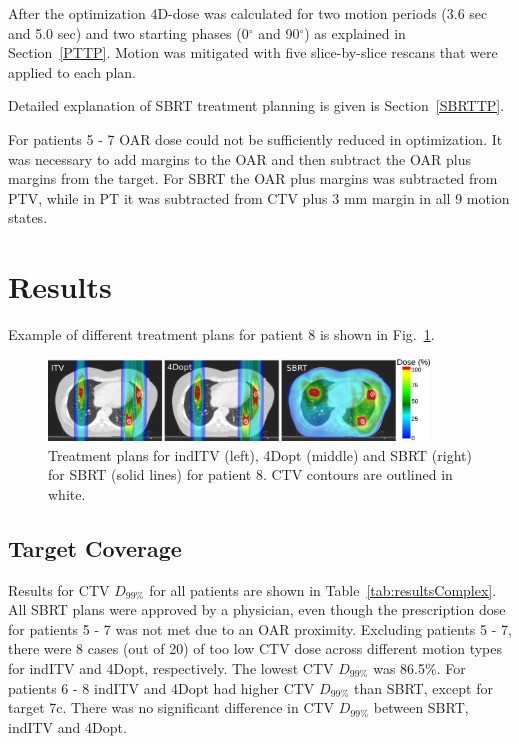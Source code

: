 After the optimization 4D-dose was calculated for two motion periods (3.6 sec and 5.0 sec) and two starting phases (0$^\circ$ and 90$^\circ$) as explained in Section~\ref{PTTP}. Motion was mitigated with five 
slice-by-slice rescans that were applied to each plan.

Detailed explanation of SBRT treatment planning is given is Section~\ref{SBRTTP}.

For patients 5 - 7 OAR dose could not be sufficiently reduced in optimization. It was necessary to add margins to the OAR and then 
subtract the OAR plus margins from the target. For SBRT the OAR plus margins was subtracted from PTV, while in PT it was subtracted from CTV plus 3 mm margin in all 9 motion states.

\section{Results}

Example of different treatment plans for patient 8 is shown in Fig.~\ref{Fig:multiExample}.

\begin{figure}[H]
	\begin{center}
		\includegraphics[width=0.9\textwidth]{./ComplexPatients/Images/multiExample.png}
		\caption{Treatment plans for indITV (left), 4Dopt (middle) and SBRT (right) for SBRT (solid lines) for patient 8. CTV contours are outlined in white.}
		\label{Fig:multiExample}
	\end{center}
\end{figure}

\subsection{Target Coverage}

Results for CTV $D_{99\%}$ for all patients are shown in Table~\ref{tab:resultsComplex}. All SBRT plans were approved by a physician, 
even though the prescription dose for patients 5 - 7 was not met due to an OAR proximity. Excluding patients 5 - 7, there were 8 cases (out of 20) of too low CTV dose across different
motion types for indITV and 4Dopt, respectively. The lowest CTV $D_{99\%}$ was 86.5\%.
For patients 6 - 8 indITV and 4Dopt had higher CTV $D_{99\%}$ than SBRT, except for target 7c.
There was no significant difference in CTV $D_{99\%}$ between SBRT, indITV and 4Dopt.

